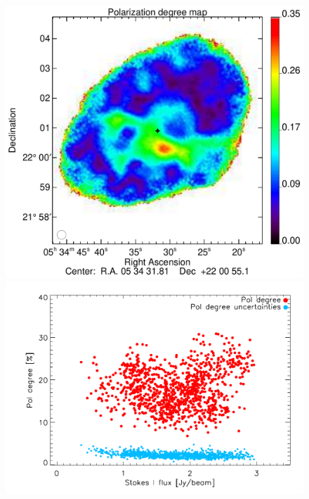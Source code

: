 \documentclass[twocolumn,traditabstract]{aa}
\begin{document}
  \begin{figure}
\centering
\includegraphics[clip, angle=0, scale = 0.35]{figures/Crab_pol_deg_v3.pdf}
\includegraphics[clip, angle=0, scale = 0.5]{figures/pol_deg_vs_I_2mm.pdf}

\end{figure}
\end{document}
